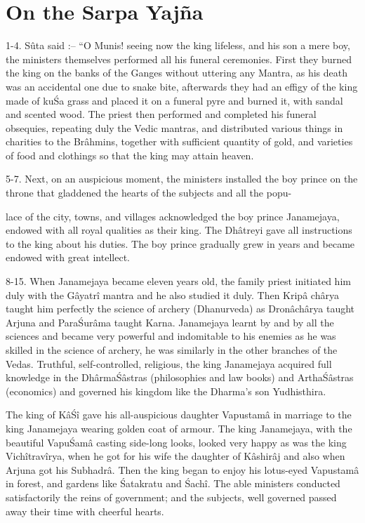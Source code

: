 ﻿\chapter{On the Sarpa Yaj\~na}

1-4. S\^uta said :-- ``O Munis! seeing now the king lifeless, and his son a mere boy, the ministers themselves performed all his funeral ceremonies. First they burned the king on the banks of the Ganges without uttering any Mantra, as his death was an accidental one due to snake bite, afterwards they had an effigy of the king made of ku\'Sa grass and placed it on a funeral pyre and burned it, with sandal and scented wood. The priest then performed and completed his funeral obsequies, repeating duly the Vedic mantras, and distributed various things in charities to the Br\^ahmins, together with sufficient quantity of gold, and varieties of food and clothings so that the king may attain heaven.

5-7. Next, on an auspicious moment, the ministers installed the boy prince on the throne that gladdened the hearts of the subjects and all the popu-

lace of the city, towns, and villages acknowledged the boy prince Janamejaya, endowed with all royal qualities as their king. The Dh\^atreyi gave all instructions to the king about his duties. The boy prince gradually grew in years and became endowed with great intellect.

8-15. When Janamejaya became eleven years old, the family priest initiated him duly with the G\^ayatr\^i mantra and he also studied it duly. Then Krip\^a ch\^arya taught him perfectly the science of archery (Dhanurveda) as Dron\^ach\^arya taught Arjuna and Para\'Sur\^ama taught Karna. Janamejaya learnt by and by all the sciences and became very powerful and indomitable to his enemies as he was skilled in the science of archery, he was similarly in the other branches of the Vedas. Truthful, self-controlled, religious, the king Janamejaya acquired full knowledge in the Dh\^arma\'S\^astras (philosophies and law books) and Artha\'S\^astras (economics) and governed his kingdom like the Dharma's son Yudhisthira.

The king of K\^a\'S\^i gave his all-auspicious daughter Vapustam\^a in marriage to the king Janamejaya wearing golden coat of armour. The king Janamejaya, with the beautiful Vapu\'Sam\^a casting side-long looks, looked very happy as was the king Vich\^itrav\^irya, when he got for his wife the daughter of K\^ashir\^aj and also when Arjuna got his Subhadr\^a. Then the king began to enjoy his lotus-eyed Vapustam\^a in forest, and gardens like \'Satakratu and \'Sach\^i. The able ministers conducted satisfactorily the reins of government; and the subjects, well governed passed away their time with cheerful hearts.

